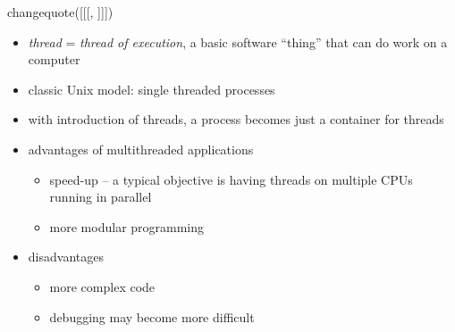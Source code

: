 changequote([[[, ]]])

\pagebreak
{}

\begin{slide}
\end{slide}


\begin{slide}
\begin{itemize}
\item \emph{thread} = \emph{thread of execution}, a basic software ``thing''
that can do work on a computer
\item classic Unix model: single threaded processes
\item with introduction of threads, a process becomes just a container for
threads
\item advantages of multithreaded applications
  \begin{itemize}
  \item speed-up -- a typical objective is having threads on multiple CPUs
  running in parallel
  \item more modular programming
  \end{itemize}
\item disadvantages
  \begin{itemize}
  \item more complex code
  \item debugging may become more difficult
  \end{itemize}
\end{itemize}
\end{slide}

